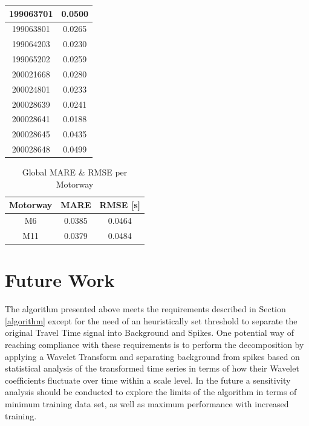 \documentclass[letterpaper, 10 pt, conference]{ieeeconf}  %
\begin{document}
\begin{table}[htbp]
\begin{center}
\begin{tabular}{|c|c|}
			\hline
			199063701& 0.0500\\
			\hline
			199063801& 0.0265\\
			\hline
			199064203& 0.0230\\
			\hline
			199065202& 0.0259\\
			\hline
			200021668& 0.0280\\
			\hline
			200024801& 0.0233\\
			\hline
			200028639& 0.0241\\
			\hline
			200028641& 0.0188\\
			\hline
			200028645& 0.0435\\
			\hline
			200028648& 0.0499\\
			\hline
		\end{tabular}
		\label{tab1}
	\end{center}
	\label{table:m6mape}
\end{table}

\begin{table}[htbp]
	\caption{Global MARE \& RMSE per Motorway}
	\begin{center}
		\begin{tabular}{|c|c|c|}
			\hline
			\textbf{Motorway}&{\textbf{MARE}}&{\textbf{RMSE [s]}} \\
			\hline
			M6& 0.0385& 0.0464\\
			\hline
			M11& 0.0379& 0.0484\\
			\hline
		\end{tabular}
		\label{mapeglobal}
	\end{center}
\end{table}

\section{Future Work}
The algorithm presented above meets the requirements described in Section \ref{algorithm} except for the need of an heuristically set threshold to separate the original Travel Time signal into Background and Spikes.
One potential way of reaching compliance with these requirements is to perform the decomposition by applying a Wavelet Transform and separating background from spikes based on statistical analysis of the transformed time series in terms of how their Wavelet coefficients fluctuate over time within a scale level. 
In the future a sensitivity analysis should be conducted to explore the limits of the algorithm in terms of minimum training data set, as well as maximum performance with increased training.\\
 \\
 \\
 \\
 \\
 
\end{document}
